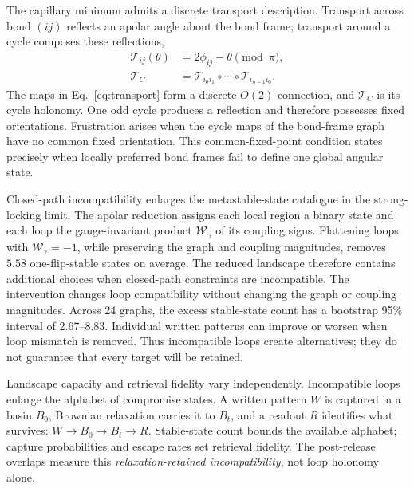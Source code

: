 \documentclass[aps,prl,reprint,superscriptaddress,nofootinbib,floatfix]{revtex4-2}
\begin{document}
The capillary minimum admits a discrete transport description. Transport
across bond \((ij)\) reflects an apolar angle about the bond frame; transport
around a cycle composes these reflections,
\begin{align}
 \mathcal T_{ij}(\theta)&=2\phi_{ij}-\theta\pmod{\pi},\nonumber\\
 \mathcal T_C&=\mathcal T_{i_0i_1}\circ\cdots\circ
 \mathcal T_{i_{n-1}i_0}.
 \label{eq:transport}
\end{align}
The maps in Eq.~\eqref{eq:transport} form a discrete \(O(2)\) connection, and
\(\mathcal T_C\) is its cycle holonomy. One odd cycle produces a reflection
and therefore possesses fixed orientations. Frustration arises when the cycle
maps of the bond-frame graph have no common fixed orientation. This
common-fixed-point condition states precisely when locally preferred bond
frames fail to define one global angular state.

Closed-path incompatibility enlarges the metastable-state catalogue in the
strong-locking limit. The apolar reduction assigns each local region a binary state and
each loop the gauge-invariant product
\(\mathcal W_\gamma\) of its coupling signs. Flattening loops with
\(\mathcal W_\gamma=-1\), while preserving the graph and coupling
magnitudes, removes \(5.58\) one-flip-stable states on average. The reduced
landscape therefore contains additional choices when closed-path
constraints are incompatible.
The intervention changes loop compatibility without changing the graph or
coupling magnitudes. Across 24 graphs, the excess stable-state count has a
bootstrap 95\% interval of 2.67--8.83. Individual written patterns can improve
or worsen when loop mismatch is removed. Thus incompatible loops create
alternatives; they do not guarantee that every target will be retained.

Landscape capacity and retrieval fidelity vary independently. Incompatible
loops enlarge the alphabet of compromise states. A written pattern \(W\) is
captured in a basin \(B_0\), Brownian relaxation carries it to \(B_t\), and a
readout \(R\) identifies what survives: \(W\to B_0\to B_t\to R\). Stable-state
count bounds the available alphabet; capture probabilities and escape rates
set retrieval fidelity. The post-release overlaps measure this
\emph{relaxation-retained incompatibility}, not loop holonomy alone.
\end{document}
